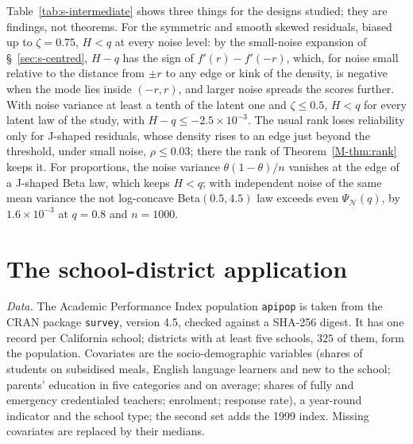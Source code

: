 \documentclass[12pt]{article}
\renewcommand{\_}{\usc\allowbreak}
\theoremstyle{definition}
\numberwithin{equation}{section}
\newcommand{\N}{\mathcal{N}}
\begin{document}
Table~\ref{tab:s-intermediate} shows three things for the designs studied; they are findings, not theorems. For the symmetric and smooth skewed residuals, biased up to $\zeta = 0.75$, $H < q$ at every noise level: by the small-noise expansion of \S~\ref{sec:s-centred}, $H - q$ has the sign of $f'(r) - f'(-r)$, which, for noise small relative to the distance from $\pm r$ to any edge or kink of the density, is negative when the mode lies inside $(-r, r)$, and larger noise spreads the scores further. With noise variance at least a tenth of the latent one and $\zeta \le 0.5$, $H < q$ for every latent law of the study, with $H - q \le -2.5 \times 10^{-3}$. The usual rank loses reliability only for J-shaped residuals, whose density rises to an edge just beyond the threshold, under small noise, $\rho \le 0.03$; there the rank of Theorem~\ref{M-thm:rank} keeps it. For proportions, the noise variance $\theta(1 - \theta)/n$ vanishes at the edge of a J-shaped Beta law, which keeps $H < q$; with independent noise of the same mean variance the not log-concave Beta$(0.5, 4.5)$ law exceeds even $\Psi_{\N}(q)$, by $1.6 \times 10^{-3}$ at $q = 0.8$ and $n = 1000$.

\section{The school-district application}\label{sec:s-app}

\emph{Data.} The Academic Performance Index population \texttt{apipop} is taken from the CRAN package \texttt{survey}, version 4.5, checked against a SHA-256 digest. It has one record per California school; districts with at least five schools, $325$ of them, form the population. Covariates are the socio-demographic variables (shares of students on subsidised meals, English language learners and new to the school; parents' education in five categories and on average; shares of fully and emergency credentialed teachers; enrolment; response rate), a year-round indicator and the school type; the second set adds the 1999 index. Missing covariates are replaced by their medians.
\end{document}

